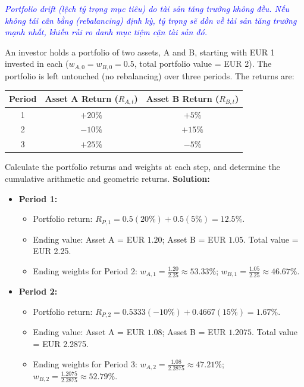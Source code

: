 \textcolor{blue}{\textit{Portfolio drift (lệch tỷ trọng mục tiêu) do tài sản tăng trưởng không đều. Nếu không tái cân bằng (rebalancing) định kỳ, tỷ trọng sẽ dồn về tài sản tăng trưởng mạnh nhất, khiến rủi ro danh mục tiệm cận tài sản đó.}}
\begin{tcolorbox}[
	colback=gray!5!white,
	colframe=black!15!white,
	boxrule=0.5pt,
	arc=3pt,
	title=\textbf{Example 1: Portfolio Drift over Three Periods},
	coltitle=black,
	colbacktitle=black!5!white,
	before skip=6pt,
	after skip=6pt,
	breakable
]
An investor holds a portfolio of two assets, A and B, starting with EUR 1 invested in each ($w_{A,0} = w_{B,0} = 0.5$, total portfolio value = EUR 2). The portfolio is left untouched (no rebalancing) over three periods. The returns are:
\begin{center}
\begin{tabular}{c c c}
	\toprule
	\textbf{Period} & \textbf{Asset A Return ($R_{A,t}$)} & \textbf{Asset B Return ($R_{B,t}$)} \\
	\midrule
	1 & $+20\%$ & $+5\%$ \\
	2 & $-10\%$ & $+15\%$ \\
	3 & $+25\%$ & $-5\%$ \\
	\bottomrule
\end{tabular}
\end{center}
Calculate the portfolio returns and weights at each step, and determine the cumulative arithmetic and geometric returns.
\textbf{Solution:}
\begin{itemize}
	\item \textbf{Period 1:}
	      \begin{itemize}
		      \item Portfolio return: $R_{P,1} = 0.5(20\%) + 0.5(5\%) = 12.5\%$.
		      \item Ending value: Asset A = EUR $1.20$; Asset B = EUR $1.05$. Total value = EUR 2.25.
		      \item Ending weights for Period 2: $w_{A,1} = \frac{1.20}{2.25} \approx 53.33\%$; $w_{B,1} = \frac{1.05}{2.25} \approx 46.67\%$.
	      \end{itemize}
	\item \textbf{Period 2:}
	      \begin{itemize}
		      \item Portfolio return: $R_{P,2} = 0.5333(-10\%) + 0.4667(15\%) = 1.67\%$.
		      \item Ending value: Asset A = EUR $1.08$; Asset B = EUR $1.2075$. Total value = EUR 2.2875.
		      \item Ending weights for Period 3: $w_{A,2} = \frac{1.08}{2.2875} \approx 47.21\%$; $w_{B,2} = \frac{1.2075}{2.2875} \approx 52.79\%$.

\end{itemize}
\end{itemize}
\end{tcolorbox}

